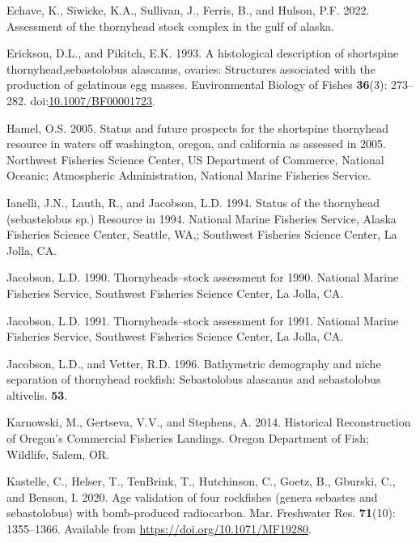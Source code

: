 \documentclass[11pt,
  english,
  letterpaper,
]{article}
\newlength{\cslhangindent}
\newenvironment{CSLReferences}[2] %
 {%
  \setlength{\parindent}{0pt}
  \ifodd #1 \everypar{\setlength{\hangindent}{\cslhangindent}}\ignorespaces\fi
  \ifnum #2 > 0
  \setlength{\parskip}{#2\baselineskip}
  \fi
 }%
 {}
\begin{document}
\begin{CSLReferences}{1}{0}
\leavevmode{}%
Echave, K., Siwicke, K.A., Sullivan, J., Ferris, B., and Hulson, P.F. 2022. Assessment of the thornyhead stock complex in the gulf of alaska.

\leavevmode{}%
Erickson, D.L., and Pikitch, E.K. 1993. A histological description of shortspine thornyhead,sebastolobus alascanus, ovaries: Structures associated with the production of gelatinous egg masses. Environmental Biology of Fishes \textbf{36}(3): 273--282. doi:\href{https://doi.org/10.1007/BF00001723}{10.1007/BF00001723}.

\leavevmode{}%
Hamel, O.S. 2005. Status and future prospects for the shortspine thornyhead resource in waters off washington, oregon, and california as assessed in 2005. Northwest Fisheries Science Center, US Department of Commerce, National Oceanic; Atmospheric Administration, National Marine Fisheries Service.

\leavevmode{}%
Ianelli, J.N., Lauth, R., and Jacobson, L.D. 1994. Status of the thornyhead (sebastelobus sp.) Resource in 1994. National Marine Fisheries Service, Alaska Fisheries Science Center, Seattle, {WA},; Southwest Fisheries Science Center, La Jolla, {CA}.

\leavevmode{}%
Jacobson, L.D. 1990. Thornyheads--stock assessment for 1990. National Marine Fisheries Service, Southwest Fisheries Science Center, La Jolla, {CA}.

\leavevmode{}%
Jacobson, L.D. 1991. Thornyheads--stock assessment for 1991. National Marine Fisheries Service, Southwest Fisheries Science Center, La Jolla, {CA}.

\leavevmode{}%
Jacobson, L.D., and Vetter, R.D. 1996. Bathymetric demography and niche separation of thornyhead rockfish: Sebastolobus alascanus and sebastolobus altivelis. \textbf{53}.

\leavevmode{}%
Karnowski, M., Gertseva, V.V., and Stephens, A. 2014. Historical {Reconstruction} of {Oregon}'s {Commercial} {Fisheries} {Landings}. Oregon Department of Fish; Wildlife, Salem, OR.

\leavevmode{}%
Kastelle, C., Helser, T., TenBrink, T., Hutchinson, C., Goetz, B., Gburski, C., and Benson, I. 2020. Age validation of four rockfishes (genera sebastes and sebastolobus) with bomb-produced radiocarbon. Mar. Freshwater Res. \textbf{71}(10): 1355--1366. Available from \url{https://doi.org/10.1071/MF19280}.


\end{CSLReferences}
\end{document}
